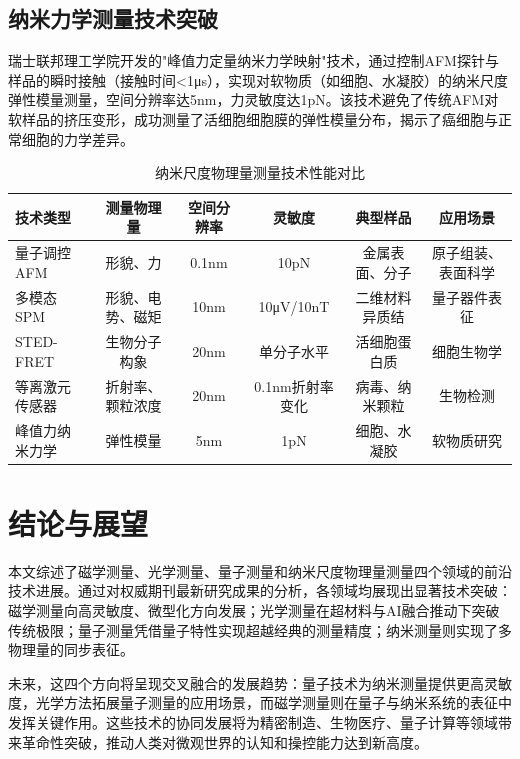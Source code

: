 \documentclass[lettersize,journal]{IEEEtran}
\newcommand{\tabhead}[1]{\textbf{#1}}
\begin{document}
	\subsection{纳米力学测量技术突破}
	瑞士联邦理工学院开发的"峰值力定量纳米力学映射"技术，通过控制AFM探针与样品的瞬时接触（接触时间<1μs），实现对软物质（如细胞、水凝胶）的纳米尺度弹性模量测量，空间分辨率达5nm，力灵敏度达1pN\cite{eth2024nano_mechanics}。该技术避免了传统AFM对软样品的挤压变形，成功测量了活细胞细胞膜的弹性模量分布，揭示了癌细胞与正常细胞的力学差异。
	
	\begin{table}[!t]
		\renewcommand{\arraystretch}{1.3}
		\caption{纳米尺度物理量测量技术性能对比}
		\label{tab:nanoscale_measurement_tech}
		\centering
		\footnotesize
		\begin{tabular}{lccccc}
			\hline
			\tabhead{技术类型} & \tabhead{测量物理量} & \tabhead{空间分辨率} & \tabhead{灵敏度} & \tabhead{典型样品} & \tabhead{应用场景} \\
			\hline
			量子调控AFM & 形貌、力 & 0.1nm & 10pN & 金属表面、分子 & 原子组装、表面科学 \\
			多模态SPM & 形貌、电势、磁矩 & 10nm & 10μV/10nT & 二维材料异质结 & 量子器件表征 \\
			STED-FRET & 生物分子构象 & 20nm & 单分子水平 & 活细胞蛋白质 & 细胞生物学 \\
			等离激元传感器 & 折射率、颗粒浓度 & 20nm & 0.1nm折射率变化 & 病毒、纳米颗粒 & 生物检测 \\
			峰值力纳米力学 & 弹性模量 & 5nm & 1pN & 细胞、水凝胶 & 软物质研究 \\
			\hline
		\end{tabular}
	\end{table}
	
	
	\section{结论与展望}
	\label{sec:conclusion}
	
	本文综述了磁学测量、光学测量、量子测量和纳米尺度物理量测量四个领域的前沿技术进展。通过对权威期刊最新研究成果的分析，各领域均展现出显著技术突破：磁学测量向高灵敏度、微型化方向发展；光学测量在超材料与AI融合推动下突破传统极限；量子测量凭借量子特性实现超越经典的测量精度；纳米测量则实现了多物理量的同步表征。
	
	未来，这四个方向将呈现交叉融合的发展趋势：量子技术为纳米测量提供更高灵敏度，光学方法拓展量子测量的应用场景，而磁学测量则在量子与纳米系统的表征中发挥关键作用。这些技术的协同发展将为精密制造、生物医疗、量子计算等领域带来革命性突破，推动人类对微观世界的认知和操控能力达到新高度。
	
	\balance
	
	
	
\end{document}
